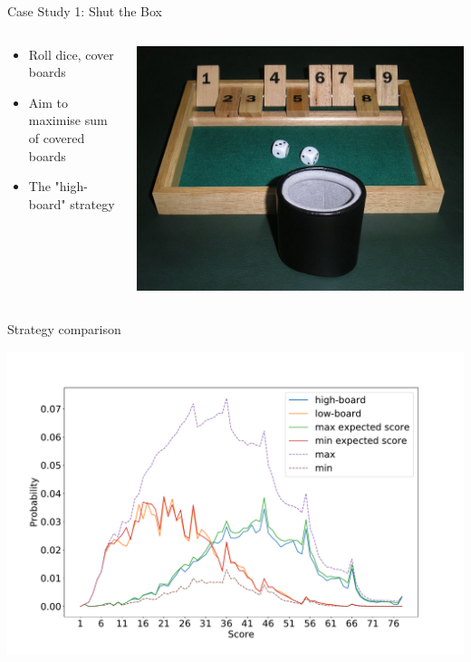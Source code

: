 \documentclass[10pt]{beamer}
\begin{document}
\begin{frame}{Case Study 1: Shut the Box}
\begin{columns}[T] 
\begin{column}{0.5\textwidth}
\begin{itemize}
    \item Roll dice, cover boards
    \item Aim to maximise sum of covered boards
    \item The "high-board" strategy
\end{itemize}
\end{column}
\begin{column}{0.5\textwidth}
\includegraphics[width=\textwidth]{images/shut_the_box.jpg}
\end{column}
\end{columns}

\end{frame}

\begin{frame}{Strategy comparison}

\includegraphics[width=\textwidth]{images/stb12_2d6_prob_score.pdf}
\end{frame}
\end{document}
